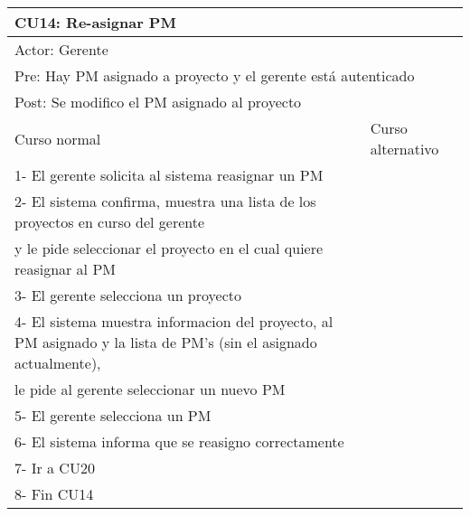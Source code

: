 \begin{table}[H]
  \begin{adjustbox}{max width = \textwidth}
  \begin{tabular}{|l|l|}
    \hline
    \multicolumn{2}{|l|}{CU14: Re-asignar PM} \\\hline
    \multicolumn{2}{|l|}{Actor: Gerente} \\\hline
    \multicolumn{2}{|l|}{Pre: Hay PM asignado a proyecto y el gerente está autenticado} \\\hline
    \multicolumn{2}{|l|}{Post: Se modifico el PM asignado al proyecto} \\\hline
     Curso normal & Curso alternativo\\ \hline
	 1- El gerente solicita al sistema reasignar un PM & \\ \hline
	 2- El sistema confirma, muestra una lista de los proyectos en curso del gerente \\ y le pide seleccionar el proyecto en el cual quiere reasignar al PM & \\ \hline
	 3- El gerente selecciona un proyecto & \\ \hline
     4- El sistema muestra informacion del proyecto, al PM asignado y la lista de PM's (sin el asignado actualmente), \\ le pide al gerente seleccionar un nuevo PM & \\ \hline
     5- El gerente selecciona un PM & \\ \hline
	 6- El sistema informa que se reasigno correctamente & \\ \hline
   7- Ir a CU20 & \\ \hline
     8- Fin CU14 & \\ \hline
  \end{tabular}
  \end{adjustbox}
\end{table}


